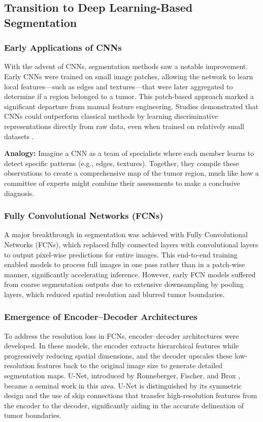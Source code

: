 \subsection{Transition to Deep Learning-Based Segmentation}
\label{sec:transition_dl}

\subsubsection{Early Applications of CNNs}
\label{sec:early_cnns}
With the advent of CNNs, segmentation methods saw a notable improvement. Early CNNs were trained on small image patches, allowing the network to learn local features—such as edges and textures—that were later aggregated to determine if a region belonged to a tumor. This patch-based approach marked a significant departure from manual feature engineering. Studies demonstrated that CNNs could outperform classical methods by learning discriminative representations directly from raw data, even when trained on relatively small datasets \cite{litjens2017survey}.

\textbf{Analogy:} Imagine a CNN as a team of specialists where each member learns to detect specific patterns (e.g., edges, textures). Together, they compile these observations to create a comprehensive map of the tumor region, much like how a committee of experts might combine their assessments to make a conclusive diagnosis.

\subsubsection{Fully Convolutional Networks (FCNs)}
\label{sec:fcns}
A major breakthrough in segmentation was achieved with Fully Convolutional Networks (FCNs), which replaced fully connected layers with convolutional layers to output pixel-wise predictions for entire images. This end-to-end training enabled models to process full images in one pass rather than in a patch-wise manner, significantly accelerating inference. However, early FCN models suffered from coarse segmentation outputs due to extensive downsampling by pooling layers, which reduced spatial resolution and blurred tumor boundaries.

\subsubsection{Emergence of Encoder–Decoder Architectures}
\label{sec:encoder_decoder_emergence}
To address the resolution loss in FCNs, encoder–decoder architectures were developed. In these models, the encoder extracts hierarchical features while progressively reducing spatial dimensions, and the decoder upscales these low-resolution features back to the original image size to generate detailed segmentation maps. U-Net, introduced by Ronneberger, Fischer, and Brox \cite{ronneberger2015unet}, became a seminal work in this area. U-Net is distinguished by its symmetric design and the use of skip connections that transfer high-resolution features from the encoder to the decoder, significantly aiding in the accurate delineation of tumor boundaries.

